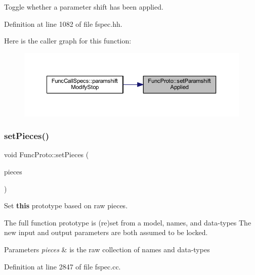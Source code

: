 Toggle whether a parameter shift has been applied. 



Definition at line 1082 of file fspec.\+hh.

Here is the caller graph for this function\+:
\nopagebreak
\begin{figure}[H]
\begin{center}
\leavevmode
\includegraphics[width=350pt]{class_func_proto_ab1a494d8691b68a76a56495907ab9f6d_icgraph}
\end{center}
\end{figure}
\mbox{\label{class_func_proto_a8e6f53c7733c8aa58d9138a8f3add2ce}} 
\subsubsection{\texorpdfstring{setPieces()}{setPieces()}}
{\footnotesize\ttfamily void Func\+Proto\+::set\+Pieces (\begin{DoxyParamCaption}\item[{const \mbox{\hyperlink{struct_prototype_pieces}{Prototype\+Pieces}} \&}]{pieces }\end{DoxyParamCaption})}



Set {\bfseries{this}} prototype based on raw pieces. 

The full function prototype is (re)set from a model, names, and data-\/types The new input and output parameters are both assumed to be locked. 
\begin{DoxyParams}{Parameters}
{\em pieces} & is the raw collection of names and data-\/types \\
\hline
\end{DoxyParams}


Definition at line 2847 of file fspec.\+cc.

